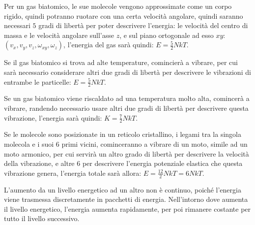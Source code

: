 \documentclass{article}
\numberwithin{equation}{subsection}
\begin{document}
Per un gas biatomico, le sue molecole vengono approssimate 
come un corpo rigido, quindi potranno ruotare con una certa 
velocità angolare, quindi saranno necessari $5$ gradi di 
libertà per poter descrivere l'energia: le velocità del 
centro di massa e le velocità angolare sull'asse $z$, e sul piano ortogonale ad esso $xy$: 
$(v_x,v_y,v_z,\omega_{xy},\omega_z)$, l'energia del gas  
sarà quindi: $E=\displaystyle\frac{5}{2}NkT$. 

Se il gas biatomico si trova ad alte temperature, comincierà a vibrare, per cui sarà necessario considerare altri due gradi di libertà per descrivere le vibrazioni di 
entrambe le particelle: $E=\displaystyle\frac{5}{2}NkT$. 



Se un gas biatomico viene riscaldato ad una temperatura molto 
alta, comincerà a vibrare, randendo necessario usare altri due 
gradi di libertà per descrivere questa vibrazione, l'energia 
sarà quindi: $K=\displaystyle\frac{7}{2}NkT$. 



Se le molecole sono posizionate in un reticolo cristallino, i legami tra la singola 
molecola e i suoi $6$ primi vicini, cominceranno a 
vibrare di un moto, simile ad un moto armonico, per 
cui servirà un altro grado di libertà per descrivere 
la velocità della vibrazione, e altre $6$ per descrivere 
l'energia potenziale elastica che questa vibrazione genera, 
l'energia totale sarà allora: $E=\displaystyle\frac{12}{2}NkT=6NkT$. 



L'aumento da un livello energetico ad un altro non è 
continuo, poiché l'energia viene trasmessa discretamente in 
pacchetti di energia. Nell'intorno dove aumenta il livello 
energetico, l'energia aumenta rapidamente, per poi 
rimanere costante per tutto il livello successivo. 
\begin{center}\end{center}
\end{document}
